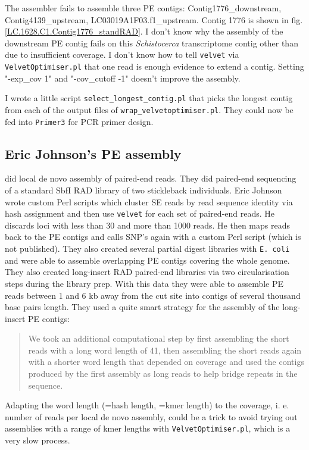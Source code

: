 \documentclass{article}\usepackage[]{graphicx}\usepackage[]{color}
\begin{document}
The assembler fails to assemble three PE contigs: Contig1776\_downstream, Contig4139\_upstream, LC03019A1F03.f1\_upstream. Contig 1776 is shown in fig. \ref{LC.1628.C1.Contig1776_standRAD}. I don't know why the assembly of the downstream PE contig fails on this \textit{Schistocerca} transcriptome contig other than due to insufficient coverage. I don't know how to tell \texttt{velvet} via \texttt{VelvetOptimiser.pl} that one read is enough evidence to extend a contig. Setting "-exp\_cov 1" and "-cov\_cutoff -1" doesn't improve the assembly.

I wrote a little script \texttt{select\_longest\_contig.pl} that picks the longest contig from each of the output files of \texttt{wrap\_velvetoptimiser.pl}. They could now be fed into \texttt{Primer3} for PCR primer design.


\subsection{Eric Johnson's PE assembly}
\label{Eric Johnson's PE assembly}
\citet{Etter2011} did local de novo assembly of paired-end reads. They did paired-end sequencing of a standard SbfI RAD library of two stickleback individuals. Eric Johnson wrote custom Perl scripts which cluster SE reads by read sequence identity via hash assignment and then use \texttt{velvet} for each set of paired-end reads. He discards loci with less than 30 and more than 1000 reads. He then maps reads back to the PE contigs and calls SNP's again with a custom Perl script  (which is not published). They also created several partial digest libraries with \texttt{E. coli} and were able to assemble overlapping PE contigs covering the whole genome. They also created long-insert RAD paired-end libraries via two circularisation steps during the library prep. With this data they were able to assemble PE reads between 1 and 6 kb away from the cut site into contigs of several thousand base pairs length. They used a quite smart strategy for the assembly of the long-insert PE contigs:
\begin{quote}
\textsf{We took an additional computational step by first assembling the short reads with a long word length of 41, then assembling the short reads again with a shorter word length that depended on coverage and used the contigs produced by the first assembly as long reads to help bridge repeats in the sequence.}
\end{quote}
Adapting the word length (=hash length, =kmer length) to the coverage, i. e. number of reads per local de novo assembly, could be a trick to avoid trying out assemblies with a range of kmer lengths with \texttt{VelvetOptimiser.pl}, which is a very slow process.
\end{document}
